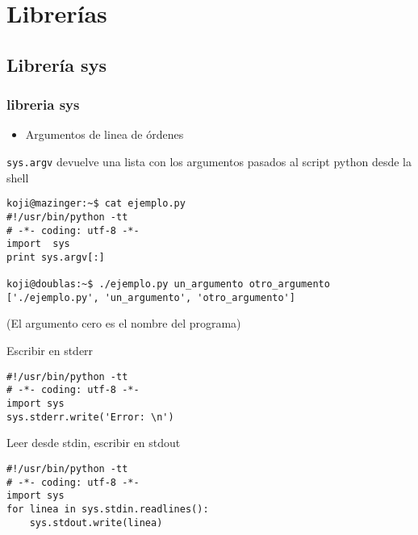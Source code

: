 \documentclass[ucs]{beamer}
\begin{document}
\section{Librerías}
\subsection{Librería sys}
\begin{frame}[fragile]
\frametitle{libreria sys}

\begin{itemize}
\item Argumentos de linea de órdenes
\end{itemize}

\verb|sys.argv| devuelve una lista con los argumentos pasados al script
python desde la shell


  \begin{scriptsize}
\begin{verbatim}
koji@mazinger:~$ cat ejemplo.py 
#!/usr/bin/python -tt
# -*- coding: utf-8 -*-
import  sys
print sys.argv[:]

koji@doublas:~$ ./ejemplo.py un_argumento otro_argumento
['./ejemplo.py', 'un_argumento', 'otro_argumento']
\end{verbatim}

(El argumento cero es el nombre del programa)

  \end{scriptsize}


\end{frame}
\begin{frame}[fragile]
Escribir en stderr
  \begin{scriptsize}
\begin{verbatim}
#!/usr/bin/python -tt
# -*- coding: utf-8 -*-
import sys
sys.stderr.write('Error: \n')
\end{verbatim}
  \end{scriptsize}

Leer desde stdin, escribir en stdout


  \begin{footnotesize}
  \begin{verbatim}
#!/usr/bin/python -tt
# -*- coding: utf-8 -*-
import sys
for linea in sys.stdin.readlines():
    sys.stdout.write(linea)

  \end{verbatim}
  \end{footnotesize}


\end{frame}
\end{document}

